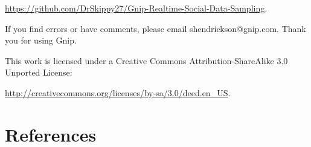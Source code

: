\documentclass{article}
\begin{document}
 
\noindent \url{https://github.com/DrSkippy27/Gnip-Realtime-Social-Data-Sampling}. 

If you find errors
or have comments, please email shendrickson@gnip.com. Thank you for using Gnip.

This work is licensed under a Creative Commons Attribution-ShareAlike 3.0 Unported License:


\noindent \url{http://creativecommons.org/licenses/by-sa/3.0/deed.en_US}.

\section{References} 

\end{document}
